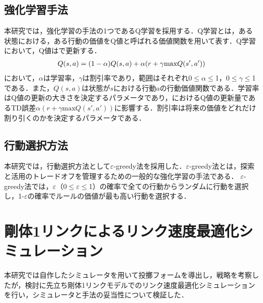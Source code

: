 \begin{small}
\subsection{強化学習手法}
本研究では，強化学習の手法の1つであるQ学習\cite{watkins}を採用する．Q学習とは，ある状態における，ある行動の価値をQ値と呼ばれる価値関数を用いて表す．Q学習において，Q値はで更新する．
\begin{eqnarray}
  \equlabel{1}
  Q(s,a)=(1-\alpha)Q(s,a)+\alpha(r+\gamma \mathrm{max}Q(s',a'))
\end{eqnarray}
において，$\alpha$は学習率，$\gamma$は割引率であり，範囲はそれぞれ0$\leq$$\alpha$$\leq$1，0$\leq$$\gamma$$\leq$1である．また，$Q(s,a)$は状態が$s$における行動$a$の行動価値関数である．学習率はQ値の更新の大きさを決定するパラメータであり，におけるQ値の更新量であるTD誤差$\alpha(r+\gamma \mathrm{max}Q(s',a'))$に影響する．割引率は将来の価値をどれだけ割り引くのかを決定するパラメータである．
\subsection{行動選択方法}
本研究では，行動選択方法として$\varepsilon$-greedy法\cite{greedy}を採用した．$\varepsilon$-greedy法とは，探索と活用のトレードオフを管理するための一般的な強化学習の手法である．
$\varepsilon$-greedy法では，$\varepsilon$（0$\leq$$\varepsilon$$\leq$1）の確率で全ての行動からランダムに行動を選択し，1-$\varepsilon$の確率でルールの価値が最も高い行動を選択する．
\section{剛体1リンクによるリンク速度最適化シミュレーション}
本研究では自作したシミュレータを用いて投擲フォームを導出し，戦略を考察したが，検討に先立ち剛体1リンクモデルでのリンク速度最適化シミュレーションを行い，シミュレータと手法の妥当性について検証した．

\end{small}
